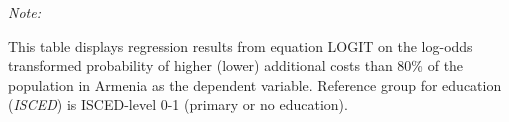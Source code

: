 \begin{table}[htbp!]
\begin{adjustbox}{width = 1\textwidth, max height = 0.95\textheight, center}
\begin{threeparttable}[b]
         \begin{tablenotes}\item \medskip \textit{Note:}
            \item This table displays regression results from equation LOGIT on the log-odds transformed probability of higher (lower) additional costs than 80\% of the population in Armenia as the dependent variable. Reference group for education (\textit{ISCED}) is ISCED-level 0-1 (primary or no education).
         \end{tablenotes}
      \end{threeparttable}
   \end{adjustbox}
\end{table}


